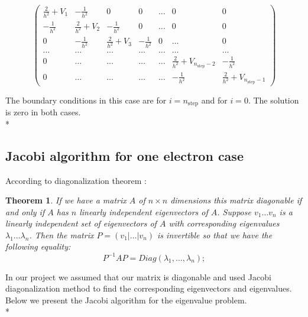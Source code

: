 \documentclass[10pt]{article}
\newtheorem*{theorem}{Theorem}
\begin{document}
\[
\left( 
\begin{array}{ccccccc}
\frac{2}{h^{2}}+V_{1} & -\frac{1}{h^{2}} & 0 & 0 & \dots  & 0 & 0 \\ 
-\frac{1}{h^{2}} & \frac{2}{h^{2}}+V_{2} & -\frac{1}{h^{2}} & 0 & \dots  & 0
& 0 \\ 
0 & -\frac{1}{h^{2}} & \frac{2}{h^{2}}+V_{3} & -\frac{1}{h^{2}} & 0 & \dots 
& 0 \\ 
\dots  & \dots  & \dots  & \dots  & \dots  & \dots  & \dots  \\ 
0 & \dots  & \dots  & \dots  & \dots  & \frac{2}{h^{2}}+V_{n_{\mathrm{step}%
	}-2} & -\frac{1}{h^{2}} \\ 
0 & \dots  & \dots  & \dots  & \dots  & -\frac{1}{h^{2}} & \frac{2}{h^{2}}%
+V_{n_{\mathrm{step}}-1}%
\end{array}%
\right) 
\]

The boundary conditions in this case are for $i=n_{\mathrm{step}}$ and for $%
i=0$. The solution is zero in both cases.\\*
\subsection{Jacobi algorithm for one electron case}
According to diagonalization theorem :
\begin{theorem}

If we have a matrix $ A $ of $ n \times n$ dimensions this matrix diagonable if and only if $ A $ has $ n $ linearly independent eigenvectors of $ A $. Suppose $ v_{1} \dots v_{n} $ is a linearly independent set of eigenvectors of $ A $ with corresponding eigenvalues $ \lambda_{1} \dots \lambda_{n} $. Then the matrix $ P = (v_{1} |\dots |v_{n}) $ is invertible so that we have the following equality:
\begin{equation}
P^{-1}AP=Diag(\lambda_{1},\dots,\lambda_{n});
\end{equation}
\end{theorem}
In our project we assumed that our matrix is diagonable and used Jacobi diagonalization method to find the corresponding eigenvectors and eigenvalues. Below we present the Jacobi algorithm for the eigenvalue problem. 
\\*
\end{document}

